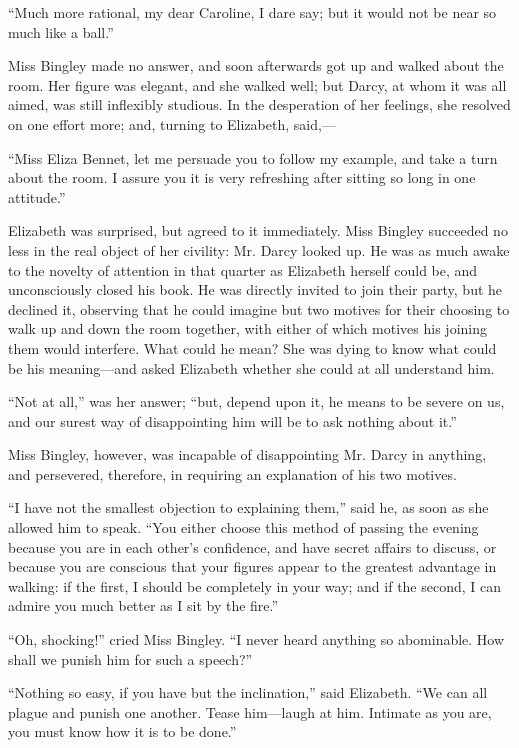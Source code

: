 ``Much more rational, my dear Caroline, I dare say; but it would not be near so much like a ball.''

Miss Bingley made no answer, and soon afterwards got up and walked about the room. Her figure was elegant, and she walked well; but Darcy, at whom it was all aimed, was still inflexibly studious. In the desperation of her feelings, she resolved on one effort more; and, turning to Elizabeth, said,---

``Miss Eliza Bennet, let me persuade you to follow my example, and take a turn about the room. I assure you it is very refreshing after sitting so long in one attitude.''

Elizabeth was surprised, but agreed to it immediately. Miss Bingley succeeded no less in the real object of her civility: Mr. Darcy looked up. He was as much awake to the novelty of attention in that quarter as Elizabeth herself could be, and unconsciously closed his book. He was directly invited to join their party, but he declined it, observing that he could imagine but two motives for their choosing to walk up and down the room together, with either of which motives his joining them would interfere. What could he mean? She was dying to know what could be his meaning---and asked Elizabeth whether she could at all understand him.

``Not at all,'' was her answer; ``but, depend upon it, he means to be severe on us, and our surest way of disappointing him will be to ask nothing about it.''

Miss Bingley, however, was incapable of disappointing Mr. Darcy in anything, and persevered, therefore, in requiring an explanation of his two motives.

``I have not the smallest objection to explaining them,'' said he, as soon as she allowed him to speak. ``You either choose this method of passing the evening because you are in each other's confidence, and have secret affairs to discuss, or because you are conscious that your figures appear to the greatest advantage in walking: if the first, I should be completely in your way; and if the second, I can admire you much better as I sit by the fire.''

``Oh, shocking!'' cried Miss Bingley. ``I never heard anything so abominable. How shall we punish him for such a speech?''

``Nothing so easy, if you have but the inclination,'' said Elizabeth. ``We can all plague and punish one another. Tease him---laugh at him. Intimate as you are, you must know how it is to be done.''

